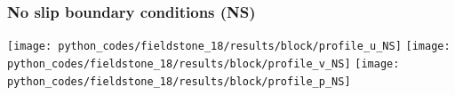 \subsubsection*{No slip boundary conditions (NS)}

\begin{center}
\texttt{[image: python\_codes/fieldstone\_18/results/block/profile\_u\_NS]}
\texttt{[image: python\_codes/fieldstone\_18/results/block/profile\_v\_NS]}
\texttt{[image: python\_codes/fieldstone\_18/results/block/profile\_p\_NS]}
\end{center}



